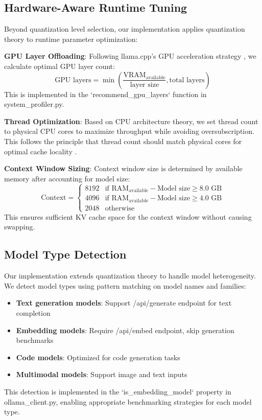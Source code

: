 \documentclass[journal]{IEEEtran}
\begin{document}
\subsection{Hardware-Aware Runtime Tuning}

Beyond quantization level selection, our implementation applies quantization theory to runtime parameter optimization:

\textbf{GPU Layer Offloading}: Following llama.cpp's GPU acceleration strategy \cite{gerganov2023}, we calculate optimal GPU layer count:
\begin{equation}
\text{GPU layers} = \min\left(\frac{\text{VRAM}_{\text{available}}}{\text{layer size}}, \text{total layers}\right)
\end{equation}
This is implemented in the `recommend_gpu_layers` function in system_profiler.py.

\textbf{Thread Optimization}: Based on CPU architecture theory, we set thread count to physical CPU cores to maximize throughput while avoiding oversubscription. This follows the principle that thread count should match physical cores for optimal cache locality \cite{llamacpp2023}.

\textbf{Context Window Sizing}: Context window size is determined by available memory after accounting for model size:
\begin{equation}
\text{Context} = \begin{cases}
8192 & \text{if } \text{RAM}_{\text{available}} - \text{Model size} \geq 8.0 \text{ GB} \\
4096 & \text{if } \text{RAM}_{\text{available}} - \text{Model size} \geq 4.0 \text{ GB} \\
2048 & \text{otherwise}
\end{cases}
\end{equation}
This ensures sufficient KV cache space for the context window without causing swapping.

\subsection{Model Type Detection}

Our implementation extends quantization theory to handle model heterogeneity. We detect model types using pattern matching on model names and families:
\begin{itemize}
    \item \textbf{Text generation models}: Support /api/generate endpoint for text completion
    \item \textbf{Embedding models}: Require /api/embed endpoint, skip generation benchmarks
    \item \textbf{Code models}: Optimized for code generation tasks
    \item \textbf{Multimodal models}: Support image and text inputs
\end{itemize}
This detection is implemented in the `is_embedding_model` property in ollama_client.py, enabling appropriate benchmarking strategies for each model type.
\end{document}
